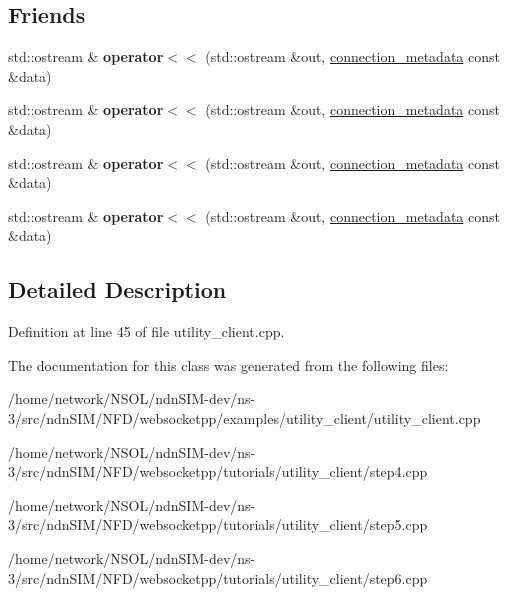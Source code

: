 \subsection*{Friends}
\begin{DoxyCompactItemize}
\item 
std\+::ostream \& {\bfseries operator$<$$<$} (std\+::ostream \&out, \hyperlink{classconnection__metadata}{connection\+\_\+metadata} const \&data)\hypertarget{classconnection__metadata_a24cddaec7a0830c80ab7b08de97d5976}{}\label{classconnection__metadata_a24cddaec7a0830c80ab7b08de97d5976}

\item 
std\+::ostream \& {\bfseries operator$<$$<$} (std\+::ostream \&out, \hyperlink{classconnection__metadata}{connection\+\_\+metadata} const \&data)\hypertarget{classconnection__metadata_a24cddaec7a0830c80ab7b08de97d5976}{}\label{classconnection__metadata_a24cddaec7a0830c80ab7b08de97d5976}

\item 
std\+::ostream \& {\bfseries operator$<$$<$} (std\+::ostream \&out, \hyperlink{classconnection__metadata}{connection\+\_\+metadata} const \&data)\hypertarget{classconnection__metadata_a24cddaec7a0830c80ab7b08de97d5976}{}\label{classconnection__metadata_a24cddaec7a0830c80ab7b08de97d5976}

\item 
std\+::ostream \& {\bfseries operator$<$$<$} (std\+::ostream \&out, \hyperlink{classconnection__metadata}{connection\+\_\+metadata} const \&data)\hypertarget{classconnection__metadata_a24cddaec7a0830c80ab7b08de97d5976}{}\label{classconnection__metadata_a24cddaec7a0830c80ab7b08de97d5976}

\end{DoxyCompactItemize}


\subsection{Detailed Description}


Definition at line 45 of file utility\+\_\+client.\+cpp.



The documentation for this class was generated from the following files\+:\begin{DoxyCompactItemize}
\item 
/home/network/\+N\+S\+O\+L/ndn\+S\+I\+M-\/dev/ns-\/3/src/ndn\+S\+I\+M/\+N\+F\+D/websocketpp/examples/utility\+\_\+client/utility\+\_\+client.\+cpp\item 
/home/network/\+N\+S\+O\+L/ndn\+S\+I\+M-\/dev/ns-\/3/src/ndn\+S\+I\+M/\+N\+F\+D/websocketpp/tutorials/utility\+\_\+client/step4.\+cpp\item 
/home/network/\+N\+S\+O\+L/ndn\+S\+I\+M-\/dev/ns-\/3/src/ndn\+S\+I\+M/\+N\+F\+D/websocketpp/tutorials/utility\+\_\+client/step5.\+cpp\item 
/home/network/\+N\+S\+O\+L/ndn\+S\+I\+M-\/dev/ns-\/3/src/ndn\+S\+I\+M/\+N\+F\+D/websocketpp/tutorials/utility\+\_\+client/step6.\+cpp\end{DoxyCompactItemize}
